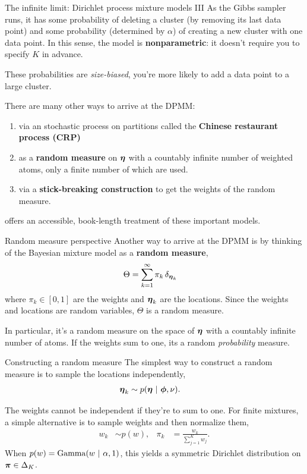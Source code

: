 \documentclass[aspectratio=169]{beamer}
\begin{document}
\begin{frame}{The infinite limit: Dirichlet process mixture models III}
As the Gibbs sampler runs, it has some probability of deleting a cluster (by removing its last data point) and some probability (determined by $\alpha$) of creating a new cluster with one data point. In this sense, the model is \textbf{nonparametric}: it doesn't require you to specify $K$ in advance. 

These probabilities are \textit{size-biased}, you're more likely to add a data point to a large cluster.

There are many other ways to arrive at the DPMM:
\begin{enumerate}
    \item via an stochastic process on partitions called the \textbf{Chinese restaurant process (CRP)}
    \item as a \textbf{random measure} on $\boldsymbol{\eta}$ with a countably infinite number of weighted atoms, only a finite number of which are used.
    \item via a \textbf{stick-breaking construction} to get the weights of the random measure.
\end{enumerate}
\citet{orbanz2012lecture} offers an accessible, book-length treatment of these important models.

\end{frame}

\begin{frame}{Random measure perspective}
Another way to arrive at the DPMM is by thinking of the Bayesian mixture model as a \textbf{random measure},
\begin{align}
    \Theta &= \sum_{k=1}^\infty \pi_k \, \delta_{\boldsymbol{\eta}_k}
\end{align}
where $\pi_k \in [0,1]$ are the weights and $\boldsymbol{\eta}_k$ are the locations. Since the weights and locations are random variables, $\Theta$ is a random measure.

In particular, it's a random measure on the space of $\boldsymbol{\eta}$ with a countably infinite number of atoms. If the weights sum to one, its a random \textit{probability} measure.
\end{frame}

\begin{frame}{Constructing a random measure}
The simplest way to construct a random measure is to sample the locations independently,
\begin{align}
    \boldsymbol{\eta}_k &\sim p(\boldsymbol{\eta} ~\vert~ \boldsymbol{\phi}, \nu).
\end{align}

The weights cannot be independent if they're to sum to one. For finite mixtures, a simple alternative is to sample weights and then normalize them,
\begin{align}
    w_k &\sim p(w), & \pi_k &= \frac{w_k}{\sum_{j=1}^K w_j}.
\end{align}
When $p(w) = \mathrm{Gamma}(w ~\vert~ \alpha, 1)$, this yields a symmetric Dirichlet distribution on $\boldsymbol{\pi} \in \Delta_K$.
\end{frame}
\end{document}
